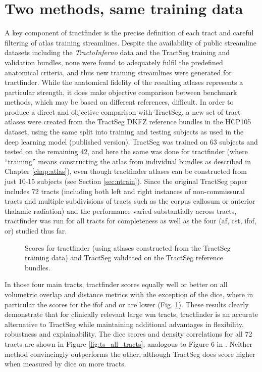 \section{Two methods, same training data}\label{sec:tractseg}

A key component of tractfinder is the precise definition of each tract and careful filtering of atlas training streamlines.
Despite the availability of public streamline datasets including the \textit{TractoInferno} data and the TractSeg training and validation bundles, none were found to adequately fulfil the predefined anatomical criteria, and thus new training streamlines were generated for tractfinder.
While the anatomical fidelity of the resulting atlases represents a particular strength, it does make objective comparison between benchmark methods, which may be based on different references, difficult.
In order to produce a direct and objective comparison with TractSeg, a new set of tract atlases were created from the TractSeg DKFZ reference bundles\autocite{Wasserthal2018b} in the HCP105 dataset, using the same split into training and testing subjects as used in the deep learning model (published version).
TractSeg was trained on 63 subjects and tested on the remaining 42, and here the same was done for tractfinder (where ``training'' means constructing the atlas from individual bundles as described in Chapter \ref{chap:atlas}), even though tractfinder atlases can be constructed from just 10-15 subjects (see Section \ref{sec:ntrain}).
Since the original TractSeg paper includes 72 tracts (including both left and right instances of non-commissural tracts and multiple subdivisions of tracts such as the corpus callosum or anterior thalamic radiation) and the performance varied substantially across tracts, tractfinder was run for all tracts for completeness as well as the four (\gls{af}, \gls{cst}, \gls{ifof}, \gls{or}) studied thus far.

\begin{figure}[htb!]
  \caption[Direct comparison between tractfinder and TractSeg, all metrics]{Scores for tractfinder (using atlases constructed from the TractSeg training data) and TractSeg validated on the TractSeg reference bundles.}
  \label{fig:ts_atlas}
\end{figure}

In those four main tracts, tractfinder scores equally well or better on all volumetric overlap and distance metrics with the exception of the \gls{dice}, where in particular the scores for the \gls{ifof} and \gls{or} are lower (Fig. \ref{fig:ts_atlas}).
These results clearly demonstrate that for clinically relevant large \gls{wm} tracts, tractfinder is an accurate alternative to TractSeg while maintaining additional advantages in flexibility, robustness and explainability.
The \gls{dice} scores and density correlations for all 72 tracts are shown in Figure \ref{fig:ts_all_tracts}, analogous to Figure 6 in \textcite{Wasserthal2018}.
Neither method convincingly outperforms the other, although TractSeg does score higher when measured by \gls{dice} on more tracts.

